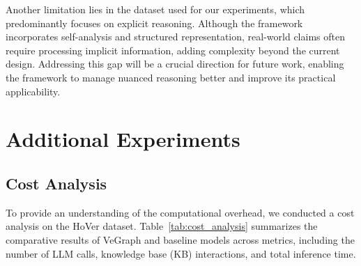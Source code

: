 \documentclass[11pt]{article}
\begin{document}
Another limitation lies in the dataset used for our experiments, which predominantly focuses on explicit reasoning. Although the framework incorporates self-analysis and structured representation, real-world claims often require processing implicit information, adding complexity beyond the current design. Addressing this gap will be a crucial direction for future work, enabling the framework to manage nuanced reasoning better and improve its practical applicability.



\appendix

\section{Additional Experiments}
\subsection{Cost Analysis}
To provide an understanding of the computational overhead, we conducted a cost analysis on the HoVer dataset. Table~\ref{tab:cost_analysis} summarizes the comparative results of VeGraph and baseline models across metrics, including the number of LLM calls, knowledge base (KB) interactions, and total inference time.
\end{document}
